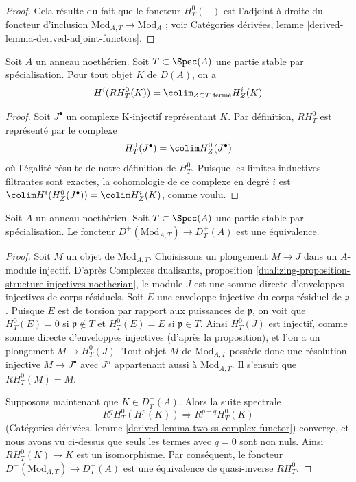 \begin{proof}
Cela résulte du fait que le foncteur $H^0_T(-)$ est l'adjoint à droite du foncteur d'inclusion $\text{Mod}_{A, T} \to \text{Mod}_A$ ; voir Catégories dérivées, lemme \ref{derived-lemma-derived-adjoint-functors}.
\end{proof}

\begin{lemma}
\label{lemma-adjoint-ext}
Soit $A$ un anneau noethérien. Soit $T \subset \Spec(A)$ une partie stable par spécialisation. Pour tout objet $K$ de $D(A)$, on a
$$
H^i(RH^0_T(K)) = \colim_{Z \subset T\text{ fermé}} H^i_Z(K)
$$
\end{lemma}

\begin{proof}
Soit $J^\bullet$ un complexe K-injectif représentant $K$. Par définition, $RH^0_T$ est représenté par le complexe
$$
H^0_T(J^\bullet) = \colim H^0_Z(J^\bullet)
$$
où l'égalité résulte de notre définition de $H^0_T$. Puisque les limites inductives filtrantes sont exactes, la cohomologie de ce complexe en degré $i$ est $\colim H^i(H^0_Z(J^\bullet)) = \colim H^i_Z(K)$, comme voulu.
\end{proof}

\begin{lemma}
\label{lemma-equal-plus}
Soit $A$ un anneau noethérien. Soit $T \subset \Spec(A)$ une partie stable par spécialisation. Le foncteur $D^+(\text{Mod}_{A, T}) \to D^+_T(A)$ est une équivalence.
\end{lemma}

\begin{proof}
Soit $M$ un objet de $\text{Mod}_{A, T}$. Choisissons un plongement $M \to J$ dans un $A$-module injectif. D'après Complexes dualisants, proposition \ref{dualizing-proposition-structure-injectives-noetherian}, le module $J$ est une somme directe d'enveloppes injectives de corps résiduels. Soit $E$ une enveloppe injective du corps résiduel de $\mathfrak p$. Puisque $E$ est de torsion par rapport aux puissances de $\mathfrak p$, on voit que $H^0_T(E) = 0$ si $\mathfrak p \not \in T$ et $H^0_T(E) = E$ si $\mathfrak p \in T$. Ainsi $H^0_T(J)$ est injectif, comme somme directe d'enveloppes injectives (d'après la proposition), et l'on a un plongement $M \to H^0_T(J)$. Tout objet $M$ de $\text{Mod}_{A, T}$ possède donc une résolution injective $M \to J^\bullet$ avec $J^n$ appartenant aussi à $\text{Mod}_{A, T}$. Il s'ensuit que $RH^0_T(M) = M$.

\medskip\noindent
Supposons maintenant que $K \in D_T^+(A)$. Alors la suite spectrale
$$
R^qH^0_T(H^p(K)) \Rightarrow R^{p + q}H^0_T(K)
$$
(Catégories dérivées, lemme \ref{derived-lemma-two-ss-complex-functor}) converge, et nous avons vu ci-dessus que seuls les termes avec $q = 0$ sont non nuls. Ainsi $RH^0_T(K) \to K$ est un isomorphisme. Par conséquent, le foncteur $D^+(\text{Mod}_{A, T}) \to D^+_T(A)$ est une équivalence de quasi-inverse $RH^0_T$.
\end{proof}

